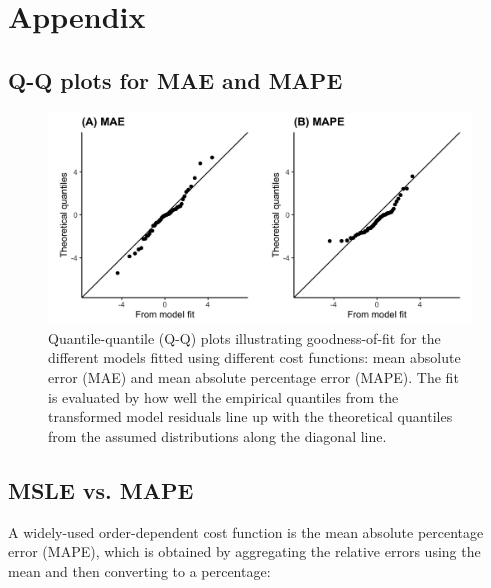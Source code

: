 \documentclass[a4paper,fleqn]{cas-sc}
\begin{document}
\appendix
\section{Appendix}

\setcounter{equation}{0}
\renewcommand{\theequation}{A.\arabic{equation}}
\setcounter{figure}{0}    
\renewcommand\thefigure{\thesection.\arabic{figure}}    
\setcounter{table}{0}
\renewcommand{\thetable}{A.\arabic{table}}

\subsection{Q-Q plots for MAE and MAPE}\label{supp-a}
    
    \begin{figure}[htbp]
    \centering
    \includegraphics[width=0.7\linewidth]{Figures/fig10_qq-plots-others.png}
    \caption{Quantile-quantile (Q-Q) plots illustrating goodness-of-fit for the different models fitted using different cost functions: mean absolute error (MAE) and mean absolute percentage error (MAPE). The fit is evaluated by how well the empirical quantiles from the transformed model residuals line up with the theoretical quantiles from the assumed distributions along the diagonal line.}
    \end{figure}

\subsection{MSLE vs. MAPE}\label{supp-b}
    
    A widely-used order-dependent cost function is the mean absolute percentage error (MAPE), which is obtained by aggregating the relative errors using the mean and then converting to a percentage: 
    
\end{document}
